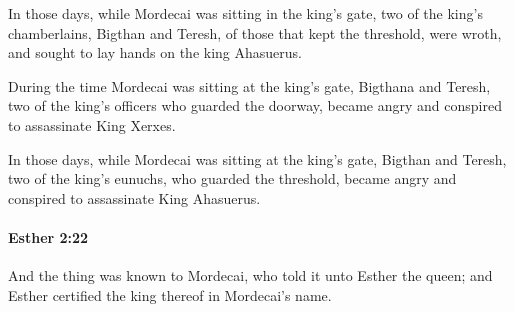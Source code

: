 			\begin{versebox}
					\item[BHS] 
					\item[LXX] 
					\item[ASV] In those days, while Mordecai was sitting in the king's gate, two of the king's chamberlains, Bigthan and Teresh, of those that kept the threshold, were wroth, and sought to lay hands on the king Ahasuerus.
					\item[NIV] During the time Mordecai was sitting at the king’s gate, Bigthana and Teresh, two of the king’s officers who guarded the doorway, became angry and conspired to assassinate King Xerxes.
					\item[NRSV] In those days, while Mordecai was sitting at the king’s gate, Bigthan and Teresh, two of the king’s eunuchs, who guarded the threshold, became angry and conspired to assassinate King Ahasuerus.
			\end{versebox}

		\paragraph{Esther 2:22} %
			\label{ESTHER-2-22}

			And the thing was known to Mordecai, who told it unto Esther the queen; and Esther certified the king thereof in Mordecai’s name.

